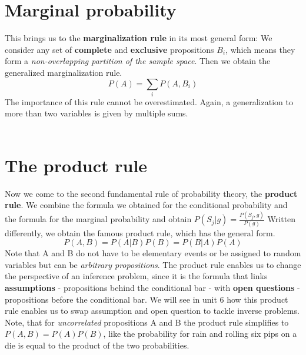 \documentclass[12pt, a4paper]{scrartcl}
\begin{document}
\section*{Marginal probability}
This brings us to the \textbf{marginalization rule} in its most general form: 
We consider any set of  \textbf{complete} and  \textbf{exclusive} propositions $B_i$, which means they form a \textit{non-overlapping partition of the sample space}.
Then we obtain the generalized marginalization rule.
\begin{equation*}\boxed{P(A)=\sum_iP(A,B_i)}\end{equation*}
The importance of this rule cannot be overestimated.
Again, a generalization to more than two variables is given by multiple sums.\\
\\

\section*{The product rule}
Now we come to the second fundamental rule of probability theory, the  \textbf{product rule}.
We combine the formula we obtained for the conditional probability and the formula for the marginal probability and obtain $P(S_j|g) = \frac{P(S_j, g)}{P(g)}$ 
Written differently, we obtain the famous product rule, which has the general form. 
\begin{equation*}\boxed{P(A,B)=P(A|B)P(B) = P(B|A)P(A)}\end{equation*}
Note that A and B do not have to be elementary events or be assigned to random variables but can be \textit{arbitrary propositions}.
The product rule enables us to change the perspective of an inference problem, since it is the formula that links  \textbf{assumptions} - propositions behind the conditional bar - with  \textbf{open questions} - propositions before the conditional bar. We will see in unit 6 how this product rule enables us to swap assumption and open question to tackle inverse problems.
Note, that for \textit{uncorrelated} propositions A and B the product rule simplifies to $P(A,B)=P(A)P(B)$, like the probability for rain and rolling six pips on a die is equal to the product of the two probabilities.\\
\end{document}
